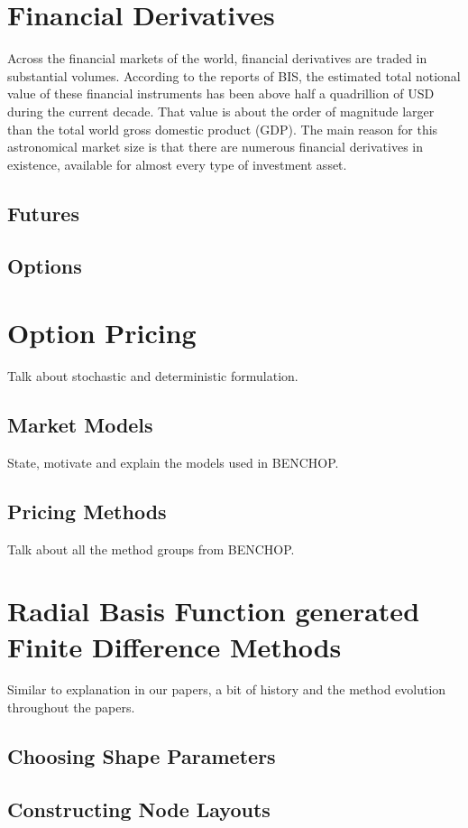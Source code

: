 \documentclass{UUThesisTemplate}
\begin{document}
\chapter{Financial Derivatives}
\label{ch:finder}
\par
Across the financial markets of the world, financial derivatives are traded in substantial volumes. According to the reports of BIS, the estimated total notional value of these financial instruments has been above half a quadrillion of USD during the current decade. That value is about the order of magnitude larger than the total world gross domestic product (GDP). The main reason for this astronomical market size is that there are numerous financial derivatives in existence, available for almost every type of investment asset.

\section{Futures}
\label{sec:futures}
\section{Options}
\label{sec:options}
\chapter{Option Pricing}
\label{ch:optionpricing}
Talk about stochastic and deterministic formulation.
\section{Market Models}
\label{sec:models}
State, motivate and explain the models used in BENCHOP.
\section{Pricing Methods}
\label{sec:methods}
Talk about all the method groups from BENCHOP.
%
%
\chapter{Radial Basis Function generated Finite Difference Methods}
\label{ch:rbffd}
Similar to explanation in our papers, a bit of history and the method evolution throughout the papers.
\section{Choosing Shape Parameters}
\section{Constructing Node Layouts}
\end{document}
